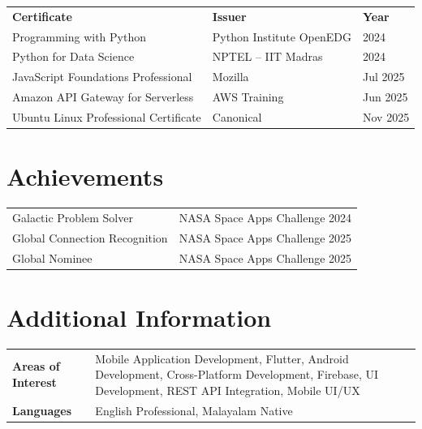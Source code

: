 \documentclass[10pt, a4paper]{article}
\begin{document}
\renewcommand{\arraystretch}{1.1}
\begin{tabular}{@{} p{7.8cm} p{6.5cm} p{2.5cm} @{}}
\textbf{Certificate}                  & \textbf{Issuer}              & \textbf{Year} \\[1pt]
Programming with Python               & Python Institute OpenEDG   & 2024 \\
Python for Data Science               & NPTEL -- IIT Madras          & 2024 \\
JavaScript Foundations Professional   & Mozilla                      & Jul 2025 \\
Amazon API Gateway for Serverless     & AWS Training                 & Jun 2025 \\
Ubuntu Linux Professional Certificate & Canonical                    & Nov 2025 \\
\end{tabular}

\section*{Achievements}

\begin{tabular}{@{} p{9.5cm} p{8cm} @{}}
Galactic Problem Solver              & NASA Space Apps Challenge 2024 \\
Global Connection Recognition        & NASA Space Apps Challenge 2025 \\
Global Nominee                       & NASA Space Apps Challenge 2025 \\
\end{tabular}

\section*{Additional Information}

\begin{tabular}{@{} >{\bfseries}p{3.8cm} p{13cm} @{}}
Areas of Interest & Mobile Application Development, Flutter, Android Development, Cross-Platform Development, Firebase, UI Development, REST API Integration, Mobile UI/UX \\
Languages         & English Professional, Malayalam Native \\
\end{tabular}
\end{document}
